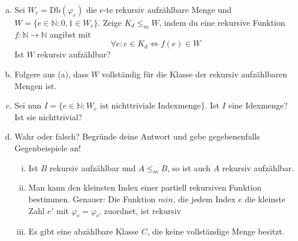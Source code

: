 \documentclass[german,headsepline]{scrartcl}
\begin{document}
	\begin{question}[subtitle={Blatt 13, 2015}]
		\begin{enumerate}[(a)]
			\item Sei $W_e=\text{Db}(\varphi_e)$ die $e$-te rekursiv aufzählbare Menge
				und $W=\{e\in\mathbb{N}\colon0,1\in W_e\}$.
				Zeige $K_d\leq_mW$, indem du eine rekursive Funktion $f:\mathbb{N}\to\mathbb{N}$ angibst mit
				\[\forall e\colon e\in K_d\Leftrightarrow f(e)\in W\]
				Ist $W$ rekursiv aufzählbar?
			\item Folgere aus (a), dass $W$ vollständig für die Klasse der rekursiv aufzählbaren Mengen ist.
			\item Sei nun $I=\{e\in\mathbb{N}\colon W_e\text{ ist nichttriviale Indexmenge}\}$.
				Ist $I$ eine Idexmenge? Ist sie nichttrivial?
			\item Wahr oder falsch?
				Begründe deine Antwort und gebe gegebenenfalls Gegenbeispiele an!
				\begin{enumerate}[(i)]
					\item Ist $B$ rekursiv aufzählbar und $A\leq_m B$, so ist auch $A$ rekursiv aufzählbar.
					\item Man kann den kleinsten Index einer partiell rekursiven Funktion bestimmen.
						Genauer: Die Funktion $min$,
						die jedem Index $e$ die kleinste Zahl $e'$ mit $\varphi_e=\varphi_{e'}$ zuordnet, ist rekursiv
					\item Es gibt eine abzählbare Klasse $C$, die keine vollständige Menge besitzt.
				\end{enumerate}
		\end{enumerate}
	\end{question}
\end{document}

